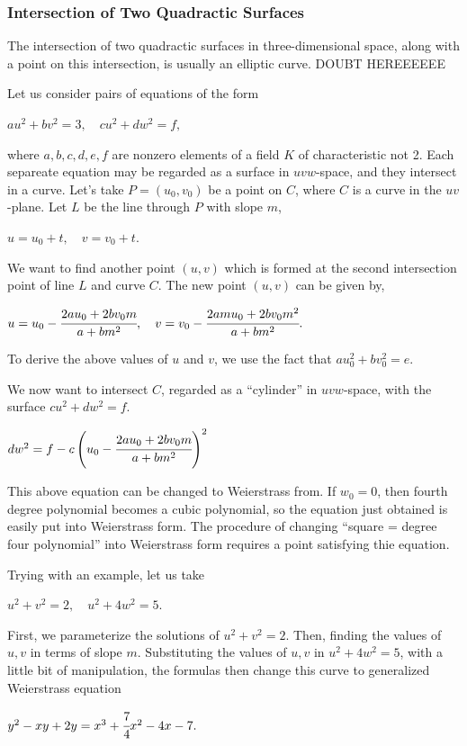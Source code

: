 \documentclass[a4paper, 12pt]{article}
\begin{document}
\subsubsection{Intersection of Two Quadractic Surfaces}
The intersection of two quadractic surfaces in three-dimensional space, along with a point on this intersection, is usually an elliptic curve.
DOUBT HEREEEEEE\par
Let us consider pairs of equations of the form
\begin{center} $au^2+bv^2=3,\quad cu^2+dw^2=f,$ \end{center}
where $a,b,c,d,e,f$ are nonzero elements of a field $K$ of characteristic not 2. Each separeate equation may be regarded as a surface in $uvw$-space, and they intersect in a curve. 
Let's take $P=(u_0,v_0)$ be a point on $C$, where $C$ is a curve in the $uv$-plane. Let $L$ be the line through $P$ with slope $m$, 
\begin{center} $u=u_0+t,\quad v=v_0+t$. \end{center}
We want to find another point $(u,v)$ which is formed at the second intersection point of line $L$ and curve $C$. The new point $(u,v)$ can be given by,
\begin{center}
$u = u_0 - \cfrac{2au_0+2bv_0m}{a+bm^2}, \quad v = v_0 - \cfrac{2amu_0+2bv_0m^2}{a+bm^2}.$
\end{center}
To derive the above values of $u$ and $v$, we use the fact that $au_0^2+bv_0^2=e$.\par
We now want to intersect $C$, regarded as a ``cylinder'' in $uvw$-space, with the surface $cu^2+dw^2=f$. 
\begin{center} $dw^2 = f - c\left( u_0 - \cfrac{2au_0+2bv_0m}{a+bm^2}\right)^2$ \end{center}
This above equation can be changed to Weierstrass from. If $w_0=0$, then fourth degree polynomial becomes a cubic polynomial, so the equation just obtained is easily put into Weierstrass form. The procedure of changing ``square = degree four polynomial'' into Weierstrass form requires a point satisfying thie equation.\par Trying with an example, let us take 
\begin{center}$u^2+v^2=2,\quad u^2+4w^2=5.$\end{center}
First, we parameterize the solutions of $u^2+v^2=2$. Then, finding the values of $u, v$ in terms of slope $m$. \newline
Substituting the values of $u,v$ in $u^2+4w^2=5$, with a little bit of manipulation, the formulas then change this curve to generalized Weierstrass equation
\begin{center} $y^2-xy+2y=x^3+\cfrac{7}{4}x^2-4x-7.$\end{center}
\end{document}

